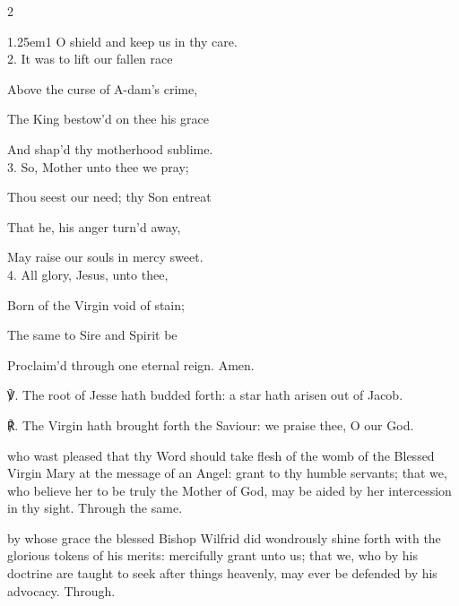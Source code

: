 \begin{paracol}{2}
\begin{hangparas}{1.25em}{1}
O shield and keep us in thy care.\\

2. It was to lift our fallen race

Above the curse of A-dam's crime,

The King bestow'd on thee his grace

And shap'd thy motherhood sublime.\\

3. So, Mother unto thee we pray;

Thou seest our need; thy Son entreat

That he, his anger turn'd away,

May raise our souls in mercy sweet.\\

4. All glory, Jesus, unto thee,

Born of the Virgin void of stain;

The same to Sire and Spirit be

Proclaim'd through one eternal reign. Amen.\\
\end{hangparas}

℣. The root of Jesse hath budded forth: a star hath arisen out of Jacob.

℟. The Virgin hath brought forth the Saviour: we praise thee, O our God.


\fussy	
\end{paracol}


\collect
{} who wast pleased that thy Word should take flesh of the womb of the Blessed Virgin Mary at the message of an Angel: grant to thy humble servants; that we, who believe her to be truly the Mother of God, may be aided by her intercession in thy sight. Through the same.



\memorialCollect
{} by whose grace the blessed Bishop Wilfrid did wondrously shine forth with the glorious tokens of his merits: mercifully grant unto us; that we, who by his doctrine are taught to seek after things heavenly, may ever be defended by his advocacy. Through.


